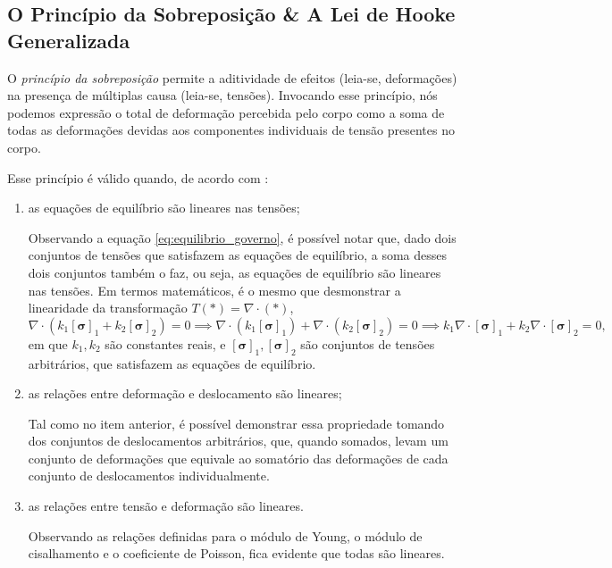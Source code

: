 \subsection{O Princípio da Sobreposição \& A Lei de Hooke Generalizada}

\begin{citacao}
    O \emph{princípio da sobreposição} permite a aditividade de efeitos (leia-se, deformações) na presença de múltiplas causa (leia-se, tensões). Invocando esse princípio, nós podemos expressão o total de deformação percebida pelo corpo como a soma de todas as deformações devidas aos componentes individuais de tensão presentes no corpo. \cite[pág. 252, tradução livre]{lub}
\end{citacao}

Esse princípio é válido quando, de acordo com \cite{lub}:
\begin{enumerate}
    \item as equações de equilíbrio são lineares nas tensões;
        
    Observando a equação \ref{eq:equilibrio_governo}, é possível notar que, dado dois conjuntos de tensões que satisfazem as equações de equilíbrio, a soma desses dois conjuntos também o faz, ou seja, as equações de equilíbrio são lineares nas tensões. Em termos matemáticos, é o mesmo que desmonstrar a linearidade da transformação $T(*) = \nabla \cdot (*)$,
        \begin{equation}
            \nabla \cdot (k_1 [\bm{\sigma}]_1 + k_2 [\bm{\sigma}]_2) = 0 \implies \nabla \cdot (k_1 [ \bm{\sigma}]_1) + \nabla \cdot (k_2[\bm{\sigma}]_2) = 0 \implies  k_1 \nabla \cdot [\bm{\sigma}]_1 + k_2 \nabla \cdot [\bm{\sigma}]_2 = 0,
        \end{equation}
        em que $k_1, k_2$ são constantes reais, e $[\bm{\sigma}]_1, [\bm{\sigma}]_2$ são conjuntos de tensões arbitrários, que satisfazem as equações de equilíbrio. 
    \item as relações entre deformação e deslocamento são lineares;
        
    Tal como no item anterior, é possível demonstrar essa propriedade tomando dos conjuntos de deslocamentos arbitrários, que, quando somados, levam um conjunto de deformações que equivale ao somatório das deformações de cada conjunto de deslocamentos individualmente.
    \item as relações entre tensão e deformação são lineares.
        
    Observando as relações definidas para o módulo de Young, o módulo de cisalhamento e o coeficiente de Poisson, fica evidente que todas são lineares.
\end{enumerate}

